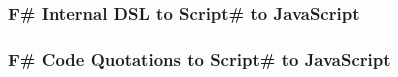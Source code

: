 		\subsubsection{F\# Internal DSL to Script\# to JavaScript} %
		\label{ssub:f_internal_dsl_to_script_to_javascript}
		

		\subsubsection{F\# Code Quotations to Script\# to JavaScript} %
		\label{ssub:f_code_quotations_to_script_to_javascript}
		





	
		

